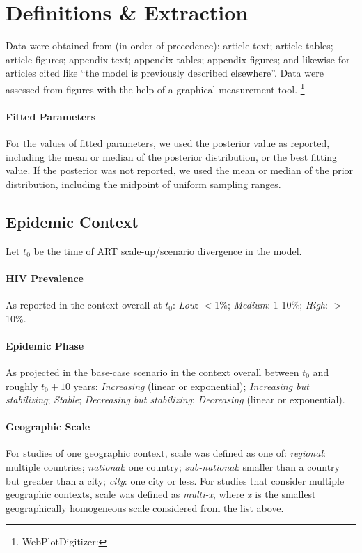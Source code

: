\section{Definitions \& Extraction}\label{app.sr.defs}
Data were obtained from (in order of precedence):
article text; article tables; article figures; appendix text; appendix tables; appendix figures;
and likewise for articles cited like ``the model is previously described elsewhere''.
Data were assessed from figures with the help of a graphical measurement tool.%
\footnote{WebPlotDigitizer: }
\paragraph{Fitted Parameters}
For the values of fitted parameters, we used the posterior value as reported, including
the mean or median of the posterior distribution, or the best fitting value.
If the posterior was not reported, we used the mean or median of the prior distribution,
including the midpoint of uniform sampling ranges.
\subsection{Epidemic Context}\label{app.sr.defs.context}
Let $t_0$ be the time of ART scale-up/scenario divergence in the model.
\paragraph{HIV Prevalence}
As reported in the context overall at $t_0$:
\emph{Low}: {$<$1\%}; \emph{Medium}: {1-10\%}; \emph{High}: {$>$10\%}.
\paragraph{Epidemic Phase}
As projected in the base-case scenario in the context overall between $t_0$ and roughly $t_0 + 10$ years:
\emph{Increasing} (linear or exponential);
\emph{Increasing but stabilizing};
\emph{Stable};
\emph{Decreasing but stabilizing};
\emph{Decreasing} (linear or exponential).
\paragraph{Geographic Scale}
For studies of one geographic context, scale was defined as one of:
\emph{regional}: multiple countries;
\emph{national}: one country;
\emph{sub-national}: smaller than a country but greater than a city;
\emph{city}: one city or less.
For studies that consider multiple geographic contexts, scale was defined as \emph{multi-x},
where \emph{x} is the smallest geographically homogeneous scale considered
from the list above.
